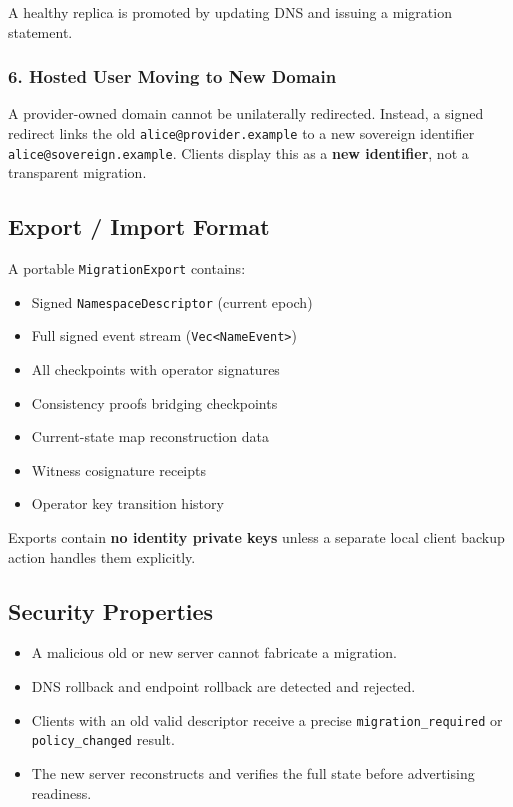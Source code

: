 \documentclass[
]{article}
\providecommand{\tightlist}{%
  \setlength{\itemsep}{0pt}\setlength{\parskip}{0pt}}
\begin{document}
A healthy replica is promoted by updating DNS and issuing a migration
statement.

\hypertarget{hosted-user-moving-to-new-domain}{%
\subsubsection{6. Hosted User Moving to New
Domain}\label{hosted-user-moving-to-new-domain}}

A provider-owned domain cannot be unilaterally redirected. Instead, a
signed redirect links the old \texttt{alice@provider.example} to a new
sovereign identifier \texttt{alice@sovereign.example}. Clients display
this as a \textbf{new identifier}, not a transparent migration.

\hypertarget{export-import-format}{%
\subsection{Export / Import Format}\label{export-import-format}}

A portable \texttt{MigrationExport} contains:

\begin{itemize}
\tightlist
\item
  Signed \texttt{NamespaceDescriptor} (current epoch)
\item
  Full signed event stream
  (\texttt{Vec\textless{}NameEvent\textgreater{}})
\item
  All checkpoints with operator signatures
\item
  Consistency proofs bridging checkpoints
\item
  Current-state map reconstruction data
\item
  Witness cosignature receipts
\item
  Operator key transition history
\end{itemize}

Exports contain \textbf{no identity private keys} unless a separate
local client backup action handles them explicitly.

\hypertarget{security-properties}{%
\subsection{Security Properties}\label{security-properties}}

\begin{itemize}
\tightlist
\item
  A malicious old or new server cannot fabricate a migration.
\item
  DNS rollback and endpoint rollback are detected and rejected.
\item
  Clients with an old valid descriptor receive a precise
  \texttt{migration\_required} or \texttt{policy\_changed} result.
\item
  The new server reconstructs and verifies the full state before
  advertising readiness.
\end{itemize}
\end{document}
